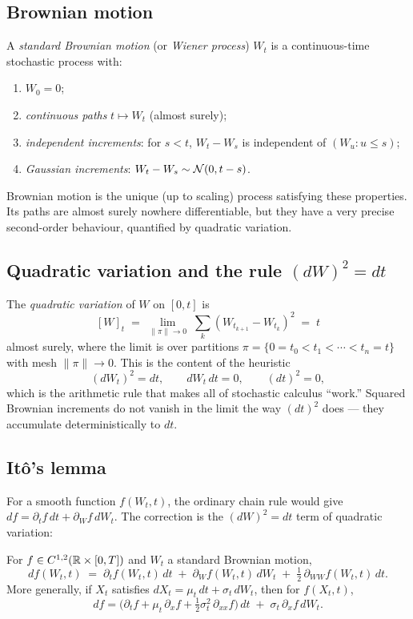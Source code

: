 \subsection{Brownian motion}

A \emph{standard Brownian motion} (or \emph{Wiener process}) $W_t$ is a
continuous-time stochastic process with:
\begin{enumerate}
  \item $W_0 = 0$;
  \item \emph{continuous paths} $t \mapsto W_t$ (almost surely);
  \item \emph{independent increments}: for $s < t$, $W_t - W_s$ is
        independent of $(W_u : u \le s)$;
  \item \emph{Gaussian increments}: $W_t - W_s \sim \mathcal{N}(0, t-s)$.
\end{enumerate}
Brownian motion is the unique (up to scaling) process satisfying
these properties. Its paths are almost surely nowhere differentiable,
but they have a very precise second-order behaviour, quantified by
quadratic variation.

\subsection{Quadratic variation and the rule $(dW)^2 = dt$}

The \emph{quadratic variation} of $W$ on $[0,t]$ is
\[
[W]_t \;=\; \lim_{\|\pi\|\to 0}\; \sum_{k} (W_{t_{k+1}} - W_{t_k})^2
\;=\; t
\]
almost surely, where the limit is over partitions
$\pi = \{0 = t_0 < t_1 < \cdots < t_n = t\}$ with mesh $\|\pi\| \to 0$.
This is the content of the heuristic
\[
(dW_t)^2 = dt, \qquad dW_t \, dt = 0, \qquad (dt)^2 = 0,
\]
which is the arithmetic rule that makes all of stochastic calculus
``work.'' Squared Brownian increments do not vanish in the limit the way
$(dt)^2$ does --- they accumulate deterministically to $dt$.

\subsection{It\^o's lemma}

For a smooth function $f(W_t, t)$, the ordinary chain rule would give
$df = \partial_t f \, dt + \partial_W f \, dW_t$. The correction is the
$(dW)^2 = dt$ term of quadratic variation:

\begin{keyfactbox}
For $f \in C^{1,2}(\mathbb{R}\times [0,T])$ and $W_t$ a standard Brownian motion,
\[
df(W_t, t) \;=\; \partial_t f(W_t, t)\, dt
              \;+\; \partial_W f(W_t, t)\, dW_t
              \;+\; \tfrac{1}{2}\, \partial_{WW} f(W_t, t)\, dt.
\]
More generally, if $X_t$ satisfies $dX_t = \mu_t\, dt + \sigma_t\, dW_t$,
then for $f(X_t, t)$,
\[
df = \Big(\partial_t f + \mu_t\, \partial_x f
         + \tfrac{1}{2}\sigma_t^2\, \partial_{xx} f\Big)\, dt
     \;+\; \sigma_t\, \partial_x f\, dW_t.
\]
\end{keyfactbox}

